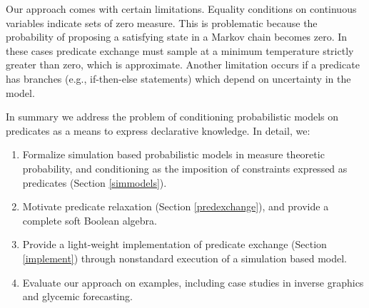 Our approach comes with certain limitations.
Equality conditions on continuous variables indicate sets of zero measure.
This is problematic because the probability of proposing a satisfying state in a Markov chain becomes zero.
In these cases predicate exchange must sample at a minimum temperature strictly greater than zero, which is approximate.
Another limitation occurs if a predicate has branches (e.g., if-then-else statements) which depend on uncertainty in the model.

In summary we address the problem of conditioning probabilistic models on predicates as a means to express declarative knowledge.
In detail, we:

\begin{enumerate}
	\item Formalize simulation based probabilistic models in measure theoretic probability, and conditioning as the imposition of constraints expressed as predicates (Section \ref{simmodels}).
	\item Motivate predicate relaxation (Section \ref{predexchange}), and provide a complete soft Boolean algebra. 
	\item Provide a light-weight implementation of predicate exchange (Section \ref{implement}) through nonstandard execution of a simulation based model.
	\item Evaluate our approach on examples, including case studies in inverse graphics and glycemic forecasting.
\end{enumerate}



